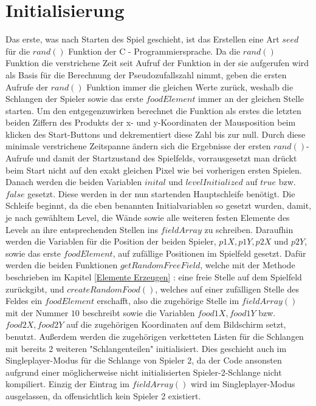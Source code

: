 \section{Initialisierung}
\label{Initialisierung}
%
Das erste, was nach Starten des Spiel geschieht, ist das Erstellen eine Art $seed$ f{\"u}r die $rand()$ Funktion der C - Programmiersprache. Da die $rand()$ Funktion die verstrichene Zeit seit Aufruf der Funktion in der sie aufgerufen wird als Basis f{\"u}r die Berechnung der Pseudozufallszahl nimmt, geben die ersten Aufrufe der $rand()$ Funktion immer die gleichen Werte zur{\"u}ck, weshalb die Schlangen der Spieler sowie das erste $foodElement$ immer an der gleichen Stelle starten. Um den entgegenzuwirken berechnet die Funktion als erstes die letzten beiden Ziffern des Produkts der x- und y-Koordinaten der Mausposition beim klicken des Start-Buttons und dekrementiert diese Zahl bis zur null. Durch diese minimale verstrichene Zeitspanne {\"a}ndern sich die Ergebnisse der ersten $rand()$-Aufrufe und damit der Startzustand des Spielfelds, vorrausgesetzt man dr{\"u}ckt beim Start nicht auf den exakt gleichen Pixel wie bei vorherigen ersten Spielen. Danach werden die beiden Variablen $inital$ und $levelInitialized$ auf $true$ bzw. $false$ gesetzt. Diese werden in der nun startenden Hauptschleife benötigt. Die Schleife beginnt, da die eben benannten Initialvariablen so gesetzt wurden, damit, je nach gew{\"a}hltem Level, die W{\"a}nde sowie alle weiteren festen Elemente des Levels an ihre entsprechenden Stellen ins $fieldArray$ zu schreiben. Daraufhin werden die Variablen f{\"u}r die Position der beiden Spieler, $p1X, p1Y, p2X$ und $p2Y$, sowie das erste $foodElement$, auf zuf{\"a}llige Positionen im Spielfeld gesetzt.
 Dafür werden die beiden Funktionen $getRandomFreeField$, welche mit der Methode beschrieben im Kapitel \ref{Elemente Erzeugen}  :  eine freie Stelle auf dem Spielfeld zurückgibt, und $createRandomFood()$, welches auf einer zufälligen Stelle des Feldes ein $foodElement$ erschafft, also die zugehörige Stelle im $fieldArray()$ mit der Nummer $10$ beschreibt sowie die Variablen $food1X, food1Y$ bzw. $food2X, food2Y$ auf die zugehörigen Koordinaten auf dem Bildschirm setzt, benutzt. Außerdem werden die zugeh{\"o}rigen verketteten Listen f{\"u}r die Schlangen mit bereits 2 weiteren "Schlangenteilen" initialisiert. Dies geschieht auch im Singleplayer-Modus f{\"u}r die Schlange von Spieler 2, da der Code ansonsten aufgrund einer m{\"o}glicherweise nicht initialisierten Spieler-2-Schlange nicht kompiliert. Einzig der Eintrag im $fieldArray()$  wird im Singleplayer-Modus ausgelassen, da offensichtlich kein Spieler 2 existiert.
